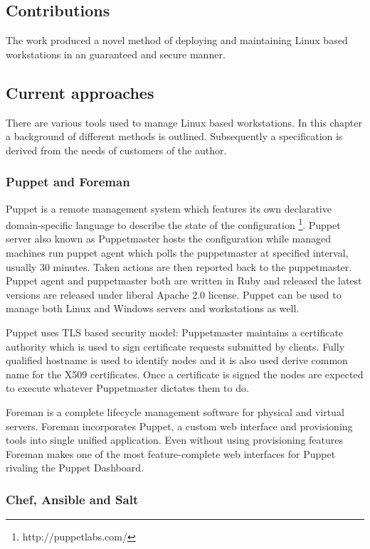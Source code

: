 \documentclass{article}
\begin{document}
\subsection{Contributions}

The work produced a novel method of deploying and maintaining Linux
based workstations in an guaranteed and secure manner.

\subsection{Current approaches}

There are various tools used to manage Linux based workstations.
In this chapter a background of different methods is outlined.
Subsequently a specification is derived from the needs of customers of
the author. 


\subsubsection{Puppet and Foreman}

Puppet is a remote management system which features its own declarative
domain-specific language to describe the state of the configuration
\footnote{http://puppetlabs.com/}. Puppet server also known as Puppetmaster
hosts the configuration while managed machines run puppet agent which polls
the puppetmaster at specified interval, usually 30 minutes. Taken actions
are then reported back to the puppetmaster. Puppet agent and puppetmaster
both are written in Ruby and released the latest versions are released under
liberal Apache 2.0 license. Puppet can be used to manage both Linux and
Windows servers and workstations as well.

Puppet uses TLS based security model:
Puppetmaster maintains a certificate authority which is used
to sign certificate requests submitted by clients.
Fully qualified hostname is used to identify nodes and
it is also used derive common name for the X509 certificates.
Once a certificate is signed the nodes are expected to
execute whatever Puppetmaster dictates them to do.

Foreman is a complete lifecycle management software for physical and virtual
servers. Foreman incorporates Puppet, a custom web interface and provisioning
tools into single unified application. Even without using provisioning features
Foreman makes one of the most feature-complete web interfaces for Puppet
rivaling the Puppet Dashboard.

\subsubsection{Chef, Ansible and Salt}
\end{document}
